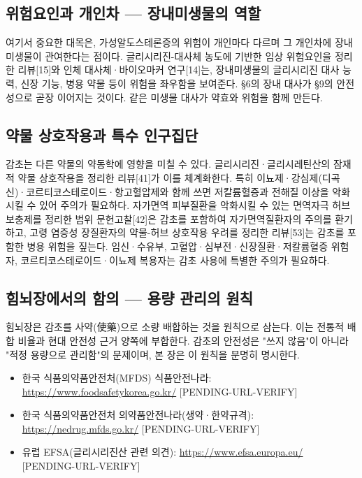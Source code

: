 \documentclass[12pt,oneside]{book}
\begin{document}
\subsection{위험요인과 개인차 — 장내미생물의 역할}

여기서 중요한 대목은, 가성알도스테론증의 위험이 개인마다 다르며 그 개인차에 장내미생물이 관여한다는 점이다. 글리시리진-대사체 농도에 기반한 임상 위험요인을 정리한 리뷰[15]와 인체 대사체·바이오마커 연구[14]는, 장내미생물의 글리시리진 대사 능력, 신장 기능, 병용 약물 등이 위험을 좌우함을 보여준다. §6의 장내 대사가 §9의 안전성으로 곧장 이어지는 것이다. 같은 미생물 대사가 약효와 위험을 함께 만든다.

\subsection{약물 상호작용과 특수 인구집단}

감초는 다른 약물의 약동학에 영향을 미칠 수 있다. 글리시리진·글리시레틴산의 잠재적 약물 상호작용을 정리한 리뷰[41]가 이를 체계화한다. 특히 이뇨제·강심제(디곡신)·코르티코스테로이드·항고혈압제와 함께 쓰면 저칼륨혈증과 전해질 이상을 악화시킬 수 있어 주의가 필요하다. 자가면역 피부질환을 악화시킬 수 있는 면역자극 허브보충제를 정리한 범위 문헌고찰[42]은 감초를 포함하여 자가면역질환자의 주의를 환기하고, 고령 염증성 장질환자의 약물-허브 상호작용 우려를 정리한 리뷰[53]는 감초를 포함한 병용 위험을 짚는다. 임신·수유부, 고혈압·심부전·신장질환·저칼륨혈증 위험자, 코르티코스테로이드·이뇨제 복용자는 감초 사용에 특별한 주의가 필요하다.

\subsection{힘뇌장에서의 함의 — 용량 관리의 원칙}

힘뇌장은 감초를 사약(使藥)으로 소량 배합하는 것을 원칙으로 삼는다. 이는 전통적 배합 비율과 현대 안전성 근거 양쪽에 부합한다. 감초의 안전성은 "쓰지 않음"이 아니라 "적정 용량으로 관리함"의 문제이며, 본 장은 이 원칙을 분명히 명시한다.

\begin{itemize}[leftmargin=6mm,itemsep=1pt,topsep=2pt]
  \item 한국 식품의약품안전처(MFDS) 식품안전나라: \url{https://www.foodsafetykorea.go.kr/} [PENDING-URL-VERIFY]
  \item 한국 식품의약품안전처 의약품안전나라(생약·한약규격): \url{https://nedrug.mfds.go.kr/} [PENDING-URL-VERIFY]
  \item 유럽 EFSA(글리시리진산 관련 의견): \url{https://www.efsa.europa.eu/} [PENDING-URL-VERIFY]
\end{itemize}
\end{document}
